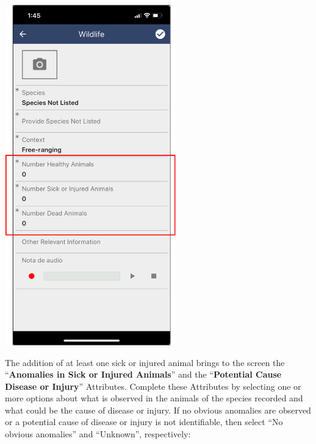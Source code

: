 \documentclass[
  letterpaper,
  DIV=11,
  numbers=noendperiod]{scrreprt}
\begin{document}
\includegraphics[width=2.91667in,height=\textheight]{Pictures_for_manual/Picture10.png}

The addition of at least one sick or injured animal brings to the screen
the ``\textbf{Anomalies in Sick or Injured Animals}'' and the
``\textbf{Potential Cause Disease or Injury}'' Attributes. Complete
these Attributes by selecting one or more options about what is observed
in the animals of the species recorded and what could be the cause of
disease or injury. If no obvious anomalies are observed or a potential
cause of disease or injury is not identifiable, then select ``No obvious
anomalies'' and ``Unknown'', respectively:
\end{document}
